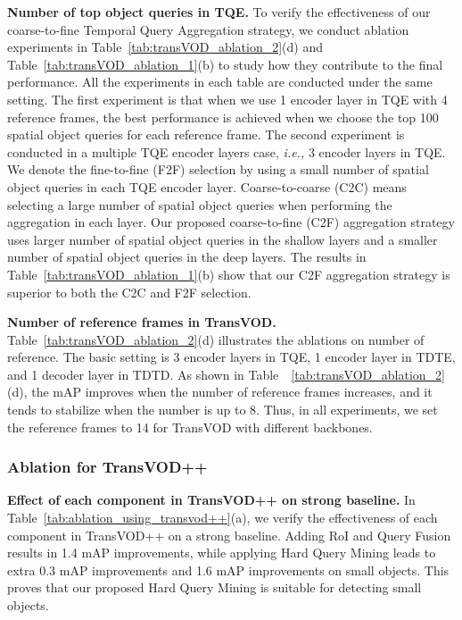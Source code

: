 \documentclass[10pt,journal,compsoc]{IEEEtran}
\begin{document}
\noindent \textbf{Number of top  object queries in TQE.}
To verify the effectiveness of our coarse-to-fine Temporal Query Aggregation strategy, we conduct ablation experiments in Table~\ref{tab:transVOD_ablation_2}(d) and Table~\ref{tab:transVOD_ablation_1}(b) to study how they contribute to the final performance. All the experiments in each table are conducted under the same setting. The first experiment is that when we use 1 encoder layer in TQE with 4 reference frames, the best performance is achieved when we choose the top 100 spatial object queries for each reference frame. The second experiment is conducted in a multiple TQE encoder layers case, \emph{i.e.,} 3 encoder layers in TQE. We denote the fine-to-fine (F2F) selection by using a small number of spatial object queries in each TQE encoder layer. Coarse-to-coarse (C2C)  means selecting a large number of spatial object queries when performing the aggregation in each layer. Our proposed coarse-to-fine (C2F) aggregation strategy uses larger number of spatial object queries in the shallow layers and a smaller number of spatial object queries in the deep layers. The results in Table~\ref{tab:transVOD_ablation_1}(b) show that our C2F aggregation strategy is superior to both the C2C and F2F selection. 

\noindent \textbf{Number of reference frames in TransVOD.} Table~\ref{tab:transVOD_ablation_2}(d) illustrates the ablations on number of reference. The basic setting is 3 encoder layers in TQE, 1 encoder layer in TDTE, and 1 decoder layer in TDTD. As shown in Table~~\ref{tab:transVOD_ablation_2}(d), the mAP improves when the number of reference frames increases, and it tends to stabilize when the number is up to 8. Thus, in all experiments, we set the reference frames to 14 for TransVOD with different backbones.



\subsubsection{Ablation for TransVOD++}

\noindent 
\textbf{Effect of each component in TransVOD++ on strong baseline.} In Table~\ref{tab:ablation_using_transvod++}(a), we verify the effectiveness of each component in TransVOD++ on a strong baseline.
Adding RoI and Query Fusion results in 1.4 mAP improvements, while applying Hard Query Mining leads to extra 0.3 mAP improvements and 1.6 mAP improvements on small objects. This proves that our proposed Hard Query Mining is suitable for detecting small objects.
\end{document}

